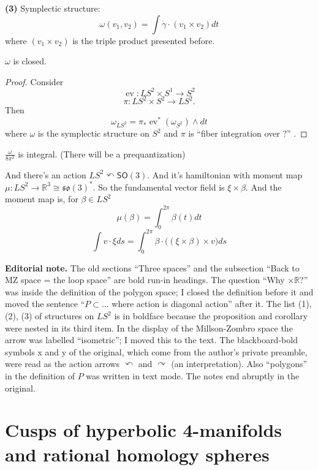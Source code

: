 {\bf (3)}
Symplectic structure:
$$\omega(v_1,v_2)=\int
\dot\gamma\cdot(v_1\times v_2) dt$$
where $(v_1\times v_2)$ is the triple product
presented before.

\begin{proposition}
\label{proposition-korshunov-omega-closed}
$\omega$ is closed.
\end{proposition}

\begin{proof}
Consider
$$\operatorname{ev}:LS^2\times S^1\to S^2$$
$$\pi:LS^2\times S^2\to LS^2.$$
Then
$$\omega_{LS^2}=\pi_*\operatorname{ev}^*(
\omega_{S^2})\wedge
dt$$
where $\omega$ is the symplectic structure on
$S^2$ and $\pi$ is ``fiber integration over
?'' .
\end{proof}

\begin{corollary}
\label{corollary-korshunov-integral}
$\frac{\omega}{8\pi^2}$ is integral. (There
will be a prequantization)
\end{corollary}

And there's an action $LS^2 \curvearrowleft
\mathsf{SO}(3)$. And it's hamiltonian with
moment map $\mu:LS^2 \to \mathbb{R}^3\cong
\mathfrak{so}(3)^*$. So the fundamental
vector field is $\xi \times \beta$. And the
moment map is, for $\beta \in LS^2$
$$\mu(\beta)=\int_{0}^{2\pi}\beta(t)dt$$
$$\int v\cdot\xi ds =
\int_{0}^{2\pi}\beta\cdot \Big((\xi \times
\beta)\times v\Big)ds$$

\medskip\noindent
{\bf Editorial note.}
The old sections ``Three spaces'' and the
subsection ``Back to MZ space = the loop
space'' are bold run-in headings. The
question ``Why $\times\mathbb{R}$?'' was
inside the definition of the polygon space; I
closed the definition before it and moved the
sentence ``$P\subset\ldots$ where action is
diagonal action'' after it. The list (1),
(2), (3) of structures on $LS^2$ is in
boldface because the proposition and
corollary were nested in its third item. In
the display of the Millson-Zombro space the
arrow was labelled ``isometric''; I moved
this to the text. The blackboard-bold symbols
x and y of the original, which come from the
author's private preamble, were read as the
action arrows $\curvearrowleft$ and
$\curvearrowright$ (an interpretation). Also
``polygons'' in the definition of $P$ was
written in text mode. The notes end abruptly
in the original.


\section{Cusps of hyperbolic 4-manifolds and
rational homology spheres}
\label{section-ferrari-cusps-hyperbolic}

